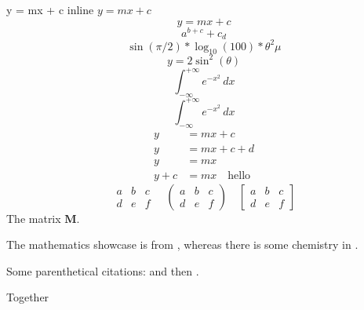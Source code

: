 \documentclass[a4paper,12pt,twocolumn]{article}
\begin{document}
y = mx + c
inline
$y = mx + c$
\[y = mx + c\]
\[a^{b + c} + c_{d}\]
\[\sin(\pi/2) * \log_{10}(100) * \theta^{2} \mu\]
\[y = 2 \sin ^ {2} (\theta)\]
\[
	\int_{-\infty}^{+\infty} e^{-x^2} \, dx
\]
\begin{equation}
	\int_{-\infty}^{+\infty} e^{-x^2} \, dx
\end{equation}
\begin{align*}
	y     & = mx + c               \\
	y     & = mx + c + d           \\
	y     & = mx                   \\
	y + c & = mx \quad\text{hello}
\end{align*}
\lipsum[1]
\[
	\begin{matrix}
		a & b & c \\
		d & e & f
	\end{matrix}
	\quad
	\begin{pmatrix}
		a & b & c \\
		d & e & f
	\end{pmatrix}
	\quad
	\begin{bmatrix}
		a & b & c \\
		d & e & f
	\end{bmatrix}
\]
The matrix $\mathbf{M}$.

\lipsum[3]

{\itshape
	\lipsum[4]
}

The mathematics showcase is from \autocite{Graham1995}, whereas
there is some chemistry in \autocite{Thomas2008}.

Some parenthetical citations: \autocite{Graham1995}
and then \autocite[p.~56]{Thomas2008}.

\autocite{alonso2020deepreinforcementlearningnavigation}

\autocite[See][pp.~45--48]{Graham1995}

Together \autocite{Graham1995,Thomas2008}

\printbibliography
\end{document}
